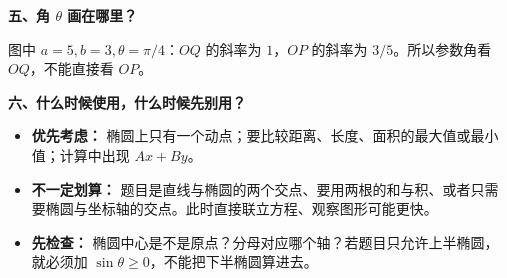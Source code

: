 \begin{explanationbox}
\medskip
\par\noindent\begin{minipage}{\linewidth}
\textbf{\textcolor{CExplanation}{五、角 $\theta$ 画在哪里？}}


\end{minipage}\par
图中 $a=5,b=3,\theta=\pi/4$：$OQ$ 的斜率为 $1$，$OP$ 的斜率为 $3/5$。所以参数角看 $OQ$，不能直接看 $OP$。

\medskip
\textbf{\textcolor{CExplanation}{六、什么时候使用，什么时候先别用？}}
\begin{itemize}[leftmargin=*,itemsep=0.45em,topsep=0.4em]
\item \textbf{优先考虑：} 椭圆上只有一个动点；要比较距离、长度、面积的最大值或最小值；计算中出现 $Ax+By$。
\item \textbf{不一定划算：} 题目是直线与椭圆的两个交点、要用两根的和与积、或者只需要椭圆与坐标轴的交点。此时直接联立方程、观察图形可能更快。
\item \textbf{先检查：} 椭圆中心是不是原点？分母对应哪个轴？若题目只允许上半椭圆，就必须加 $\sin\theta\ge0$，不能把下半椭圆算进去。
\end{itemize}
\end{explanationbox}
